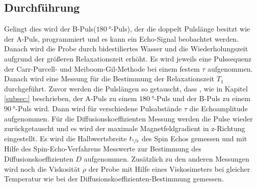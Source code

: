 \subsection{Durchführung}
Gelingt dies wird der B-Puls($\SI{180}{\degree}$-Puls),
der die doppelt Pulslänge besitzt wie der A-Puls,
programmiert und es kann ein Echo-Signal beobachtet werden.
Danach wird die Probe durch bidestiliertes Wasser
und die Wiederholungszeit aufgrund der größeren Relaxationszeit
erhöht. Es wird jeweils eine Pulssequenz der Carr-Purcell-
und Meiboom-Gil-Methode bei einem festem $\tau$ aufgenommen.
Danach wird eine Messung für die Bestimmung der Relaxationszeit $T_1$
durchgeführt. Zuvor werden die Pulslängen so getauscht, dass , wie in Kapitel \ref{subsec:}
beschrieben, der A-Puls zu einem $\SI{180}{\degree}$-Puls
und der B-Puls zu einem $\SI{90}{\degree}$-Puls wird.
Dann wird für verschiedene Pulsabstände $\tau$ die Echoamplitude aufgenommen.
Für die Diffusionskoeffizienten Messung
werden die Pulse wieder zurückgetauscht
und es wird der maximale Magnetfeldgradient
in z-Richtung eingestellt. Es wird die Halbwertsbreite $t_{\sfrac{1}{2}}$
des Spin Echos gemessen und mit Hilfe
des Spin-Echo-Verfahrens Messwerte zur Bestimmung
des Diffusionskoeffizienten $D$ aufgenommen.
Zusätzlich zu den anderen Messungen
wird noch die Viskosität $\rho$
der Probe mit Hilfe eines Viskosimeters
bei gleicher Temperatur wie bei der
Diffusionskoeffizienten-Bestimmung gemessen.
